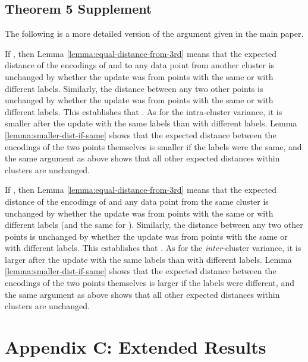 \documentclass[runningheads]{llncs}
\begin{document}
\subsection{Theorem 5 Supplement}
The following is a more detailed version of the argument given in the main paper.

If , then Lemma \ref{lemma:equal-distance-from-3rd} means that the expected distance of the encodings of  and  to any data point from another cluster is unchanged by whether the update was from points with the same or with different labels. Similarly, the distance between any two other points is unchanged by whether the update was from points with the same or with different labels. This establishes that . As for the intra-cluster variance, it is smaller after the update with the same labels than with different labels. Lemma \ref{lemma:smaller-dist-if-same} shows that the expected distance between the encodings of the two points themselves is smaller if the labels were the same, and the same argument as above shows that all other expected distances within clusters are unchanged.

If , then Lemma \ref{lemma:equal-distance-from-3rd} means that the expected distance of the encodings of  and any data point from the same cluster is unchanged by whether the update was from points with the same or with different labels (and the same for ). Similarly, the distance between any two other points is unchanged by whether the update was from points with the same or with different labels. This establishes that . As for the \emph{inter}-cluster variance, it is larger after the update with the same labels than with different labels. Lemma \ref{lemma:smaller-dist-if-same} shows that the expected distance between the encodings of the two points themselves is larger if the labels were different, and the same argument as above shows that all other expected distances within clusters are unchanged.

 
\section{Appendix C: Extended Results} \label{app:extended-results}
\end{document}
